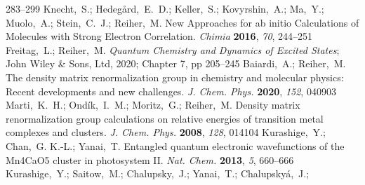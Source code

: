 \documentclass[journal=jctcce]{achemso}
\begin{document}
\begin{mcitethebibliography}{79}
  283--299\relax
\mciteBstWouldAddEndPuncttrue
\mciteSetBstMidEndSepPunct{\mcitedefaultmidpunct}
{\mcitedefaultendpunct}{\mcitedefaultseppunct}\relax
\EndOfBibitem
{}
Knecht,~S.; Hedeg{\aa}rd,~E.~D.; Keller,~S.; Kovyrshin,~A.; Ma,~Y.; Muolo,~A.;
  Stein,~C.~J.; Reiher,~M. {New Approaches for ab initio Calculations of
  Molecules with Strong Electron Correlation}. \emph{Chimia} \textbf{2016},
  \emph{70}, 244--251\relax
\mciteBstWouldAddEndPuncttrue
\mciteSetBstMidEndSepPunct{\mcitedefaultmidpunct}
{\mcitedefaultendpunct}{\mcitedefaultseppunct}\relax
\EndOfBibitem
{}
Freitag,~L.; Reiher,~M. \emph{Quantum Chemistry and Dynamics of Excited
  States}; John Wiley \& Sons, Ltd, 2020; Chapter 7, pp 205--245\relax
\mciteBstWouldAddEndPuncttrue
\mciteSetBstMidEndSepPunct{\mcitedefaultmidpunct}
{\mcitedefaultendpunct}{\mcitedefaultseppunct}\relax
\EndOfBibitem
{}
Baiardi,~A.; Reiher,~M. {The density matrix renormalization group in chemistry
  and molecular physics: Recent developments and new challenges}. \emph{J.
  Chem. Phys.} \textbf{2020}, \emph{152}, 040903\relax
\mciteBstWouldAddEndPuncttrue
\mciteSetBstMidEndSepPunct{\mcitedefaultmidpunct}
{\mcitedefaultendpunct}{\mcitedefaultseppunct}\relax
\EndOfBibitem
{}
Marti,~K.~H.; Ond{\'{i}}k,~I.~M.; Moritz,~G.; Reiher,~M. {Density matrix
  renormalization group calculations on relative energies of transition metal
  complexes and clusters}. \emph{J. Chem. Phys.} \textbf{2008}, \emph{128},
  014104\relax
\mciteBstWouldAddEndPuncttrue
\mciteSetBstMidEndSepPunct{\mcitedefaultmidpunct}
{\mcitedefaultendpunct}{\mcitedefaultseppunct}\relax
\EndOfBibitem
{}
Kurashige,~Y.; Chan,~G. K.-L.; Yanai,~T. {Entangled quantum electronic
  wavefunctions of the Mn4CaO5 cluster in photosystem II}. \emph{Nat. Chem.}
  \textbf{2013}, \emph{5}, 660--666\relax
\mciteBstWouldAddEndPuncttrue
\mciteSetBstMidEndSepPunct{\mcitedefaultmidpunct}
{\mcitedefaultendpunct}{\mcitedefaultseppunct}\relax
\EndOfBibitem
{}
Kurashige,~Y.; Saitow,~M.; Chalupsky,~J.; Yanai,~T.; Chalupsky{\'{a}},~J.;

\end{mcitethebibliography}
\end{document}
